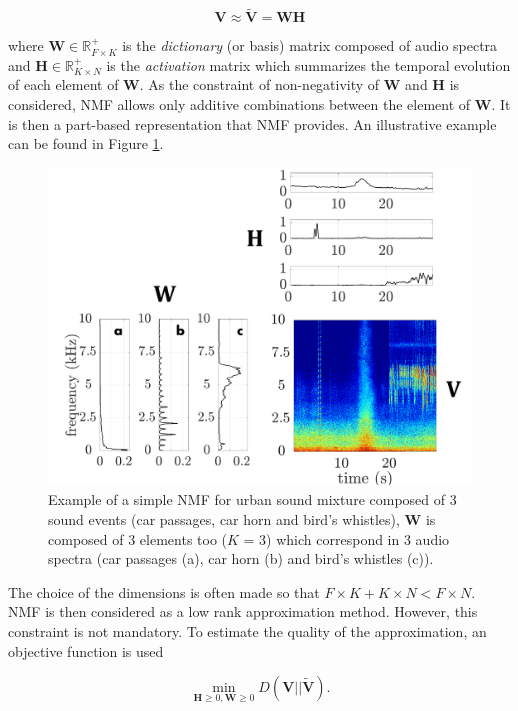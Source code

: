 \documentclass[twocolumn]{svjour3}          %
\begin{document}
\begin{equation}\label{eq:nmf}
\mathbf{V} \approx \mathbf{\tilde{V}} = \mathbf{WH}
\end{equation}

where $\mathbf{W} \in \mathbb{R}^+_{F \times K}$ is the \textit{dictionary} (or basis) matrix composed of audio spectra and $\mathbf{H} \in \mathbb{R}^+_{K \times N}$ is the \textit{activation} matrix which summarizes the temporal evolution of each element of $\mathbf{W}$. As the constraint of non-negativity of $\mathbf{W}$ and $\mathbf{H}$ is considered, NMF allows only additive combinations between the element of $\mathbf{W}$. It is then a part-based representation that NMF provides. An illustrative example can be found in Figure \ref{fig:example_NMF}.

\begin{figure}[t]
\centering
\includegraphics[width=0.9\linewidth]{figures/schema_introduction_nmf.pdf}
\caption{Example of a simple NMF for urban sound mixture composed of 3 sound events (car passages, car horn and bird's whistles), $\mathbf{W}$ is composed of 3 elements too ($K$ = 3) which correspond in 3 audio spectra (car passages (a), car horn (b) and bird's whistles (c)).}
\label{fig:example_NMF}
\end{figure}

The choice of the dimensions is often made so that $F\times K + K \times N < F \times N$. NMF is then considered as a low rank approximation method. However, this constraint is not mandatory. To estimate the quality of the approximation, an objective function is used

\begin{equation}\label{eq:min-D-WH}
\underset{\mathbf{H} \geq 0, \mathbf{W} \geq 0}{\min} D\left(\mathbf{V} \vert \vert \mathbf{\tilde{V}}\right).
\end{equation}
\end{document}
